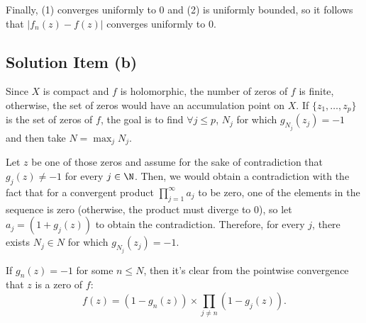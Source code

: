 Finally, (1) converges uniformly to 0 and (2) is uniformly bounded, so it follows that $|f_n(z) - f(z)|$ converges uniformly to 0.

\subsection*{Solution Item (b)}

Since $X$ is compact and $f$ is holomorphic, the number of zeros of $f$ is finite, otherwise, the set of zeros would have an accumulation point on $X$. If $\{z_1,\ldots, z_p\}$ is the set of zeros of $f$, the goal is to find $\forall j \leq p$, $N_j$ for which $g_{N_j}(z_j) = -1$ and then take $N = \max_j N_j$.

Let $z$ be one of those zeros and assume for the sake of contradiction that $g_j(z) \neq -1$ for every $j\in \N$. Then, we would obtain a contradiction with the fact that for a convergent product $\prod_{j= 1}^\infty a_j$ to be zero, one of the elements in the sequence is zero (otherwise, the product must diverge to 0), so let $a_j = (1+g_j(z))$ to obtain the contradiction. Therefore, for every $j$, there exists $N_j\in N$ for which $g_{N_j}(z_j) = -1$.

If $g_n(z) = -1$ for some $n \leq N$, then it's clear from the pointwise convergence that $z$ is a zero of $f$:
\[ f(z) = (1 - g_n(z)) \times \prod_{j\neq n} (1-g_j(z)). \]